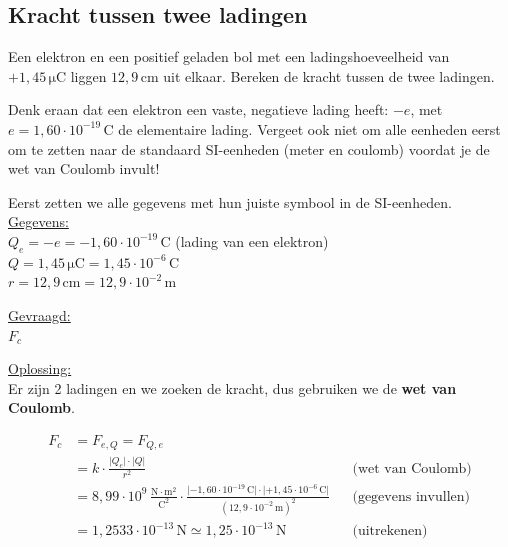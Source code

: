 \documentclass{ximera}
\begin{document}
\subsection{Kracht tussen twee ladingen}
\begin{example}[foldable=true,title={Voorbeeld: de kracht tussen twee geladen systemen}]\nl
    Een elektron en een positief geladen bol met een ladingshoeveelheid van $+1{,}45 \, \mathrm{\mu C}$ liggen $12{,}9 \, \mathrm{cm}$ uit elkaar. Bereken de kracht tussen de twee ladingen.
    
    \begin{hint}
        Denk eraan dat een elektron een vaste, negatieve lading heeft: $-e$, met $e = 1{,}60 \cdot 10^{-19} \, \mathrm{C}$ de elementaire lading. Vergeet ook niet om alle eenheden eerst om te zetten naar de standaard SI-eenheden (meter en coulomb) voordat je de wet van Coulomb invult!
    \end{hint}

    \begin{solution}\nl
        Eerst zetten we alle gegevens met hun juiste symbool in de SI-eenheden.\\[1ex]
        
        \underline{Gegevens:}\\
        $Q_{e} = -e = -1{,}60 \cdot 10^{-19} \, \mathrm{C}$ \quad (lading van een elektron)\\
        $Q = 1{,}45 \, \mathrm{\mu C} = 1{,}45 \cdot 10^{-6} \, \mathrm{C}$\\
        $r = 12{,}9 \, \mathrm{cm} = 12{,}9 \cdot 10^{-2} \, \mathrm{m}$
        
        \vspace{2ex}
        \underline{Gevraagd:}\\
        $F_{c}$
        
        \vspace{2ex}
        \underline{Oplossing:}\\
        Er zijn 2 ladingen en we zoeken de kracht, dus gebruiken we de \textbf{wet van Coulomb}.
        
        \begin{align*}
            F_{c} &= F_{e,Q} = F_{Q,e} \\
            &= k \cdot \frac{\lvert Q_{e}\rvert \cdot \lvert Q\rvert}{r^{2}} && \text{(wet van Coulomb)} \\
            &= 8{,}99 \cdot 10^9 \, \mathrm{\frac{N\cdot m^2}{C^2}} \cdot \frac{\lvert -1{,}60 \cdot 10^{-19} \, \mathrm{C}\rvert \cdot \lvert +1{,}45 \cdot 10^{-6} \, \mathrm{C}\rvert}{(12{,}9 \cdot 10^{-2} \, \mathrm{m})^{2}} && \text{(gegevens invullen)} \\
            &= 1{,}2533 \cdot 10^{-13} \, \mathrm{N} \simeq \boxed{1{,}25 \cdot 10^{-13} \, \mathrm{N}} && \text{(uitrekenen)}
        \end{align*}
    \end{solution}
\end{example}
\end{document}
